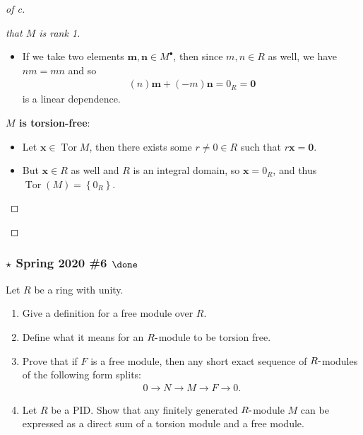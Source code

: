 \begin{proof}[of c]
\begin{proof}[that $M$ is rank 1]
\begin{itemize}
  \begin{itemize}
  \tightlist
  \item
    If we take two elements \(\mathbf{m}, \mathbf{n} \in M^{\bullet}\),
    then since \(m, n\in R\) as well, we have \(nm = mn\) and so
    \begin{align*}
    (n)\mathbf{m} + (-m)\mathbf{n} = 0_R = \mathbf{0}
    \end{align*}
    is a linear dependence.
  \end{itemize}
\end{itemize}

\textbf{\(M\) is torsion-free}:

\begin{itemize}
\item
  Let \(\mathbf{x} \in \operatorname{Tor}M\), then there exists some
  \(r\neq 0\in R\) such that \(r\mathbf{x} = \mathbf{0}\).
\item
  But \(\mathbf{x}\in R\) as well and \(R\) is an integral domain, so
  \(\mathbf{x}=0_R\), and thus
  \(\operatorname{Tor}(M) = \left\{{0_R}\right\}\).
\end{itemize}

\end{proof}

\end{proof}

\hypertarget{star-spring-2020-6-done}{%
\subsubsection{\texorpdfstring{\(\star\) Spring 2020 \#6
\(\done\)}{\textbackslash star Spring 2020 \#6 \textbackslash done}}\label{star-spring-2020-6-done}}

Let \(R\) be a ring with unity.

\begin{enumerate}
\def\labelenumi{\alph{enumi}.}
\item
  Give a definition for a free module over \(R\).
\item
  Define what it means for an \(R{\hbox{-}}\)module to be torsion free.
\item
  Prove that if \(F\) is a free module, then any short exact sequence of
  \(R{\hbox{-}}\)modules of the following form splits:
  \begin{align*}
  0 \to N \to M \to F \to 0
  .\end{align*}
\item
  Let \(R\) be a PID. Show that any finitely generated
  \(R{\hbox{-}}\)module \(M\) can be expressed as a direct sum of a
  torsion module and a free module.
\end{enumerate}

